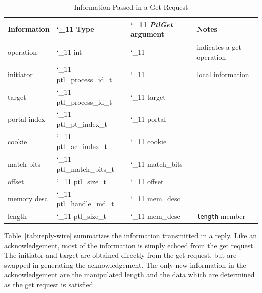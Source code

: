 \documentclass{sand-report}
\def\makeunderletter{\catcode`_11\relax}
\begin{document}
\begin{table}[htbp]
  \begin{center}\small
    \begin{tabular}{l>{\ttfamily\makeunderletter}l>{\ttfamily\makeunderletter}ll}
Information  & \textrm{Type}    & \textrm{\emph{PtlGet} argument} & Notes \\ \hline
operation    & int              &            & indicates a get operation \\
initiator    & ptl_process_id_t &            & local information \\
target       & ptl_process_id_t & target     & \\
portal index & ptl_pt_index_t   & portal     & \\
cookie       & ptl_ac_index_t   & cookie     & \\
match bits   & ptl_match_bits_t & match_bits & \\
offset       & ptl_size_t       & offset     & \\
memory desc  & ptl_handle_md_t  & mem_desc   & \\
length       & ptl_size_t       & mem_desc   & \texttt{length} member \\
    \end{tabular}
    \caption{Information Passed in a Get Request}
    \label{tab:get-wire}
  \end{center}
\end{table}

Table~\ref{tab:reply-wire} summarizes the information transmitted in a
reply.  Like an acknowledgement, most of the information is simply
echoed from the get request.  The initiator and target are obtained
directly from the get request, but are swapped in generating the
acknowledgement.  The only new information in the acknowledgement are
the manipulated length and the data which are determined as the get
request is satisfied.
\end{document}
